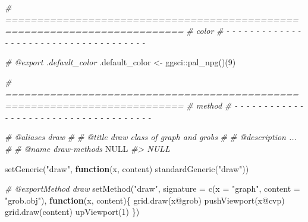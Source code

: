 \documentclass[
]{article}
\newenvironment{Shaded}{\begin{snugshade}}{\end{snugshade}}
\newcommand{\AttributeTok}[1]{\textcolor[rgb]{0.77,0.63,0.00}{#1}}
\newcommand{\CommentTok}[1]{\textcolor[rgb]{0.56,0.35,0.01}{\textit{#1}}}
\newcommand{\ConstantTok}[1]{\textcolor[rgb]{0.00,0.00,0.00}{#1}}
\newcommand{\ControlFlowTok}[1]{\textcolor[rgb]{0.13,0.29,0.53}{\textbf{#1}}}
\newcommand{\DecValTok}[1]{\textcolor[rgb]{0.00,0.00,0.81}{#1}}
\newcommand{\FunctionTok}[1]{\textcolor[rgb]{0.00,0.00,0.00}{#1}}
\newcommand{\NormalTok}[1]{#1}
\newcommand{\OtherTok}[1]{\textcolor[rgb]{0.56,0.35,0.01}{#1}}
\newcommand{\SpecialCharTok}[1]{\textcolor[rgb]{0.00,0.00,0.00}{#1}}
\newcommand{\StringTok}[1]{\textcolor[rgb]{0.31,0.60,0.02}{#1}}
\begin{document}
\begin{Shaded}
\begin{Highlighting}[]
\CommentTok{\# ==========================================================================}
\CommentTok{\# color}
\CommentTok{\# {-} {-} {-} {-} {-} {-} {-} {-} {-} {-} {-} {-} {-} {-} {-} {-} {-} {-} {-} {-} {-} {-} {-} {-} {-} {-} {-} {-} {-} {-} {-} {-} {-} {-} {-} {-} {-}}

\CommentTok{\#\textquotesingle{} @export .default\_color}
\NormalTok{.default\_color }\OtherTok{\textless{}{-}}\NormalTok{ ggsci}\SpecialCharTok{::}\FunctionTok{pal\_npg}\NormalTok{()(}\DecValTok{9}\NormalTok{)}
\end{Highlighting}
\end{Shaded}

\begin{Shaded}
\begin{Highlighting}[]
\CommentTok{\# ==========================================================================}
\CommentTok{\# method}
\CommentTok{\# {-} {-} {-} {-} {-} {-} {-} {-} {-} {-} {-} {-} {-} {-} {-} {-} {-} {-} {-} {-} {-} {-} {-} {-} {-} {-} {-} {-} {-} {-} {-} {-} {-} {-} {-} {-} {-}}

\CommentTok{\#\textquotesingle{} @aliases draw}
\CommentTok{\#\textquotesingle{}}
\CommentTok{\#\textquotesingle{} @title draw class of \textquotesingle{}graph\textquotesingle{} and \textquotesingle{}grobs\textquotesingle{}}
\CommentTok{\#\textquotesingle{}}
\CommentTok{\#\textquotesingle{} @description ...}
\CommentTok{\#\textquotesingle{}}
\CommentTok{\#\textquotesingle{} @name draw{-}methods}
\ConstantTok{NULL}
\CommentTok{\#\textgreater{} NULL}

\FunctionTok{setGeneric}\NormalTok{(}\StringTok{"draw"}\NormalTok{, }
  \ControlFlowTok{function}\NormalTok{(x, content)}
    \FunctionTok{standardGeneric}\NormalTok{(}\StringTok{"draw"}\NormalTok{))}

\CommentTok{\#\textquotesingle{} @exportMethod draw}
\FunctionTok{setMethod}\NormalTok{(}\StringTok{"draw"}\NormalTok{, }
  \AttributeTok{signature =} \FunctionTok{c}\NormalTok{(}\AttributeTok{x =} \StringTok{"graph"}\NormalTok{, }\AttributeTok{content =} \StringTok{"grob.obj"}\NormalTok{),}
  \ControlFlowTok{function}\NormalTok{(x, content)\{}
    \FunctionTok{grid.draw}\NormalTok{(x}\SpecialCharTok{@}\NormalTok{grob)}
    \FunctionTok{pushViewport}\NormalTok{(x}\SpecialCharTok{@}\NormalTok{cvp)}
    \FunctionTok{grid.draw}\NormalTok{(content)}
    \FunctionTok{upViewport}\NormalTok{(}\DecValTok{1}\NormalTok{)}
\NormalTok{  \})}


\end{Highlighting}
\end{Shaded}
\end{document}
